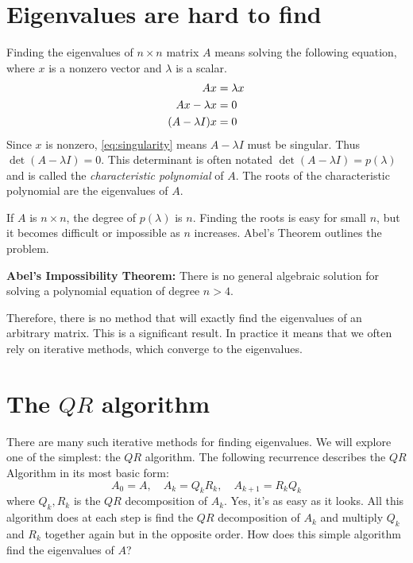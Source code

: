\label{lab:EigSolve}

\section*{Eigenvalues are hard to find}

Finding the eigenvalues of $n \times n$ matrix $A$ means solving the following equation, where $x$ is a nonzero vector and $\lambda$ is a scalar.
\begin{align}
A x &= \lambda x \notag \\
A x - \lambda x &= 0 \notag \\
(A - \lambda I)x  &= 0 \label{eq:singularity}
\end{align}
Since $x$ is nonzero, \eqref{eq:singularity} means $A-\lambda I$ must be singular.
Thus $\det(A - \lambda I) = 0$.  This determinant is often notated $\det(A - \lambda I) = p(\lambda)$ and is called the \emph{characteristic polynomial} of $A$.
The roots of the characteristic polynomial are the eigenvalues of $A$.

If $A$ is $n \times n$, the degree of $p(\lambda)$ is  $n$.
Finding the roots is easy for small $n$, but it becomes difficult or impossible as $n$ increases.
Abel's Theorem  outlines the problem.

\begin{theorem}
{\bf Abel's Impossibility Theorem:} There is no general algebraic solution for solving a polynomial equation of degree $n>4$.
\label{Theorem:Abel}
\end{theorem}

Therefore, there is no method that will exactly find the eigenvalues of an arbitrary matrix.
This is a significant result. In practice it means that we often rely on iterative methods, which converge to the eigenvalues.

\section*{The $QR$ algorithm}

There are many such iterative methods for finding eigenvalues.
We will explore one of the simplest: the $QR$ algorithm.
The following recurrence describes the $QR$ Algorithm in its most basic form:
\begin{equation*}
A_0 = A, \quad A_k = Q_k R_k, \quad A_{k+1} = R_k Q_k
\end{equation*}
where $Q_k, R_k$ is the $QR$ decomposition of $A_k$.
Yes, it's as easy as it looks.
All this algorithm does at each step is find the $QR$ decomposition of $A_k$ and multiply $Q_k$ and $R_k$ together again but in the opposite order.
How does this simple algorithm find the eigenvalues of $A$?


